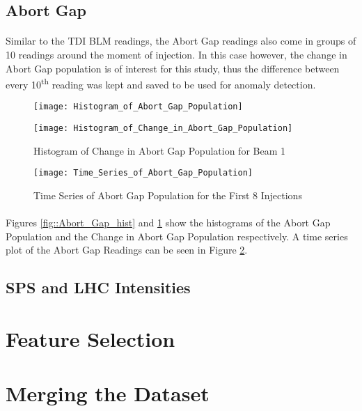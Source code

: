 \subsection{Abort Gap}
\paragraph{ }Similar to the \acs{TDI} \acs{BLM} readings, the Abort Gap readings also come in groups of 10 readings around the moment of injection. In this case however, the change in Abort Gap population is of interest for this study, thus the difference between every 10\textsuperscript{th} reading was kept and saved to be used for anomaly detection.

\begin{figure}[!t]
	\begin{minipage}[b]{0.475\linewidth}
		\centering
		\texttt{[image: Histogram\_of\_Abort\_Gap\_Population]}
		\caption[Abort Gap Histogram]{Histogram of Abort Gap Population for Beam 1}
		\label{fig::Abort_Gap_hist}
	\end{minipage}	
	\hspace{0.25cm}
	\begin{minipage}[b]{0.475\linewidth}
		\centering
		\texttt{[image: Histogram\_of\_Change\_in\_Abort\_Gap\_Population]}
		\caption[Change in Abort Gap Histogram]{Histogram of Change in Abort Gap Population for Beam 1}
		\label{fig::Change_in_Abort_Gap_hist}
	\end{minipage}	
\end{figure}

\begin{figure}[b]
	\centering
	\texttt{[image: Time\_Series\_of\_Abort\_Gap\_Population]}
	\caption[Abort Gap Time Series]{Time Series of Abort Gap  Population for the First 8 Injections}
	\label{fig::Abort_Gap_Time_Series}
\end{figure}  


\paragraph{ }Figures \ref{fig::Abort_Gap_hist} and \ref{fig::Change_in_Abort_Gap_hist} show the histograms of the Abort Gap Population and the Change in Abort Gap Population respectively. A time series plot of the Abort Gap Readings can be seen in Figure \ref{fig::Abort_Gap_Time_Series}.

\subsection{SPS and LHC Intensities}

\section{Feature Selection}


\section{Merging the Dataset}
\label{sec::Merging_the_Dataset}